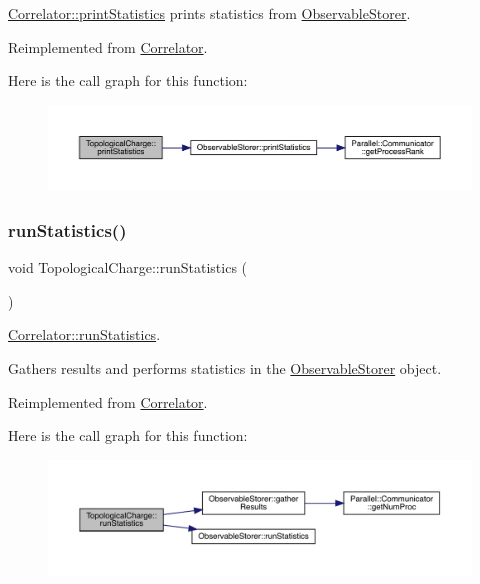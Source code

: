 \mbox{\hyperlink{class_correlator_a2168d677f547769784781d2e2aaa53cf}{Correlator\+::print\+Statistics}} prints statistics from \mbox{\hyperlink{class_observable_storer}{Observable\+Storer}}. 



Reimplemented from \mbox{\hyperlink{class_correlator_a2168d677f547769784781d2e2aaa53cf}{Correlator}}.

Here is the call graph for this function\+:\nopagebreak
\begin{figure}[H]
\begin{center}
\leavevmode
\includegraphics[width=350pt]{class_topological_charge_ad56263921d283d315b04ab40c9594a2c_cgraph}
\end{center}
\end{figure}
\mbox{\label{class_topological_charge_ab9afadb9f37e638c0a168ebab5d41353}} 
\subsubsection{\texorpdfstring{runStatistics()}{runStatistics()}}
{\footnotesize\ttfamily void Topological\+Charge\+::run\+Statistics (\begin{DoxyParamCaption}{ }\end{DoxyParamCaption})\hspace{0.3cm}{\ttfamily [virtual]}}



\mbox{\hyperlink{class_correlator_a35197b1d12b62ef30b79c0138a26456e}{Correlator\+::run\+Statistics}}. 

Gathers results and performs statistics in the \mbox{\hyperlink{class_observable_storer}{Observable\+Storer}} object. 

Reimplemented from \mbox{\hyperlink{class_correlator_a35197b1d12b62ef30b79c0138a26456e}{Correlator}}.

Here is the call graph for this function\+:\nopagebreak
\begin{figure}[H]
\begin{center}
\leavevmode
\includegraphics[width=350pt]{class_topological_charge_ab9afadb9f37e638c0a168ebab5d41353_cgraph}
\end{center}
\end{figure}



